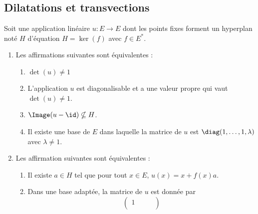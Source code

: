 \subsection{Dilatations et transvections}

\begin{theorem}     \label{ThoooAZKDooNDcznv}
    Soit une application linéaire \( u\colon E\to E\) dont les points fixes forment un hyperplan noté \( H\) d'équation \( H=\ker(f)\) avec \( f\in E^*\).
    \begin{enumerate}
        \item     
            Les affirmations suivantes sont équivalentes :
            \begin{enumerate}
                \item  \label{ITEMooZHYRooFGKaifi}
                    \( \det(u)\neq 1\)
                \item       \label{ooXKLWooTfUMzV}
                    L'application \( u\) est diagonalisable et a une valeur propre qui vaut \( \det(u)\neq 1\).
                \item       \label{ooMZPTooCLylbh}  
                    \( \Image(u-\id)\nsubseteq H\).
                \item   \label{ITEMooZHYRooFGKaifiv}
                    Il existe une base de \( E\) dans laquelle la matrice de \( u\) est \( \diag(1,\ldots, 1,\lambda)\) avec \( \lambda\neq 1\).
            \end{enumerate}
        \item
            Les affirmation suivantes sont équivalentes :
            \let\oldthenumii\theenumi
            \renewcommand{\theenumii}{\roman{enumii}}
            \begin{enumerate}
                \item       \label{ITEMooRTIEooOoWCFsa}
                    Il existe \( a\in H\) tel que pour tout \( x\in E\), \( u(x)=x+f(x)a\).
                \item       \label{ITEMooRTIEooOoWCFsb}
                    Dans une base adaptée, la matrice de \( u\) est donnée par
                    \begin{equation}
                        \begin{pmatrix}
                             1   &       &       &       \\

\end{pmatrix}
\end{equation}
\end{enumerate}
\end{enumerate}
\end{theorem}
